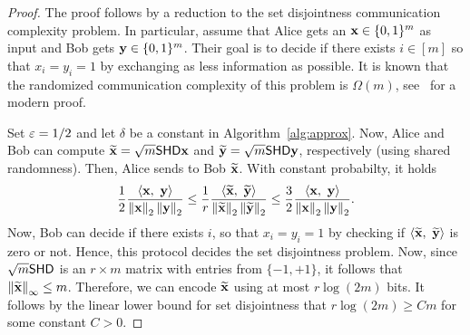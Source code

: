 \begin{proof}
The proof follows by a reduction to the set disjointness communication complexity problem. In particular, assume that Alice gets an $\mathbf{x}\in\{0,1\}^m$ as input and Bob gets $\mathbf{y}\in\{0,1\}^m$. Their goal is to decide if there exists $i\in{[m]}$ so that $x_i = y_i = 1$ by exchanging as less information as possible. It is known that the randomized communication complexity of this problem is $\Omega(m)$, see~\cite{DISJ} for a modern proof.

Set $\varepsilon = 1/2$ and let $\delta$ be a constant in Algorithm~\ref{alg:approx}. Now, Alice and Bob can compute $\widetilde{\mathbf{x}} = \sqrt{m}{\mathsf{S} } {\mathsf{H} }{\mathsf{D} } \mathbf{x}$ and $\widetilde{\mathbf{y}} = \sqrt{m}{\mathsf{S} } {\mathsf{H} }{\mathsf{D} } \mathbf{y}$, respectively (using shared randomness). Then, Alice sends to Bob $\widetilde{\mathbf{x}}$. With constant probabilty, it holds
%
	\[ \frac1{2}\frac{\left\langle {\mathbf{x}},\ {\mathbf{y}} \right\rangle}{\left\|\mathbf{x}\right\|_2\left\|\mathbf{y}\right\|_2} \leq \frac1{r} \frac{\left\langle {\widetilde{\mathbf{x}}},\ {\widetilde{\mathbf{y}}} \right\rangle}{\left\|\widetilde{\mathbf{x}}\right\|_2\left\|\widetilde{\mathbf{y}}\right\|_2} \leq \frac{3}{2} \frac{\left\langle {\mathbf{x}},\ {\mathbf{y}} \right\rangle}{\left\|\mathbf{x}\right\|_2\left\|\mathbf{y}\right\|_2}. \]
%
Now, Bob can decide if there exists $i$, so that $x_i=y_i =1$ by checking if $\left\langle {\widetilde{\mathbf{x}}},\ {\widetilde{\mathbf{y}}} \right\rangle$ is zero or not. Hence, this protocol decides the set disjointness problem. Now, since $\sqrt{m}{\mathsf{S} }{\mathsf{H} } {\mathsf{D} }$ is an $r\times m$ matrix with entries from $\{-1,+1\}$, it follows that $\left\|\widetilde{\mathbf{x}}\right\|_\infty \leq m$. Therefore, we can encode $\widetilde{\mathbf{x}}$ using at most $r \log(2m)$ bits. It follows by the linear lower bound for set disjointness that $r\log(2m) \geq C m$ for some constant $C>0$.
\end{proof}
%
%
%
%
